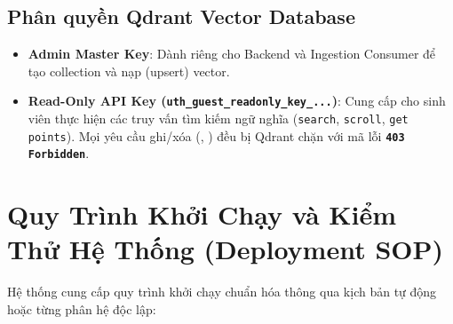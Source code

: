 \subsection{Phân quyền Qdrant Vector Database}
\begin{itemize}
  \item \textbf{Admin Master Key}: Dành riêng cho Backend và Ingestion Consumer để tạo collection và nạp (upsert) vector.
  \item \textbf{Read-Only API Key (\texttt{uth\_guest\_readonly\_key\_...})}: Cung cấp cho sinh viên thực hiện các truy vấn tìm kiếm ngữ nghĩa (\texttt{search}, \texttt{scroll}, \texttt{get points}). Mọi yêu cầu ghi/xóa (, ) đều bị Qdrant chặn với mã lỗi \textbf{\texttt{403 Forbidden}}.
\end{itemize}

\section{Quy Trình Khởi Chạy và Kiểm Thử Hệ Thống (Deployment SOP)}

Hệ thống cung cấp quy trình khởi chạy chuẩn hóa thông qua kịch bản tự động hoặc từng phân hệ độc lập:

